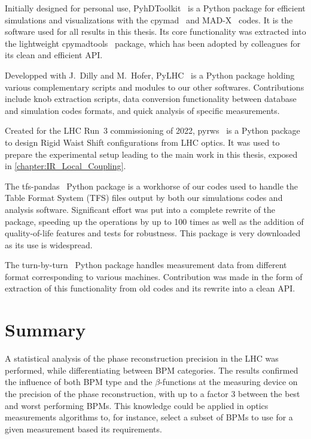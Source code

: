 Initially designed for personal use, PyhDToolkit~\cite{CODE:Soubelet:pyhdtoolkit} is a Python package for efficient simulations and visualizations with the cpymad~\cite{CODE:HIBTC:cpymad} and MAD-X~\cite{CODE:MADX_guide} codes.
It is the software used for all results in this thesis.
Its core functionality was extracted into the lightweight cpymadtools~\cite{CODE:Soubelet:cpymadtools} package, which has been adopted by colleagues for its clean and efficient API.

Developped with J.~Dilly and M.~Hofer, PyLHC~\cite{CODE:OMC:pylhc} is a Python package holding various complementary scripts and modules to our other softwares.
Contributions include knob extraction scripts, data conversion functionality between database and simulation codes formats, and quick analysis of specific measurements.

Created for the LHC Run~\num{3} commissioning of \num{2022}, pyrws~\cite{CODE:Soubelet:pyrws} is a Python package to design Rigid Waist Shift configurations from LHC optics.
It was used to prepare the experimental setup leading to the main work in this thesis, exposed in \cref{chapter:IR_Local_Coupling}.

The tfs-pandas~\cite{CODE:OMC:tfs_pandas} Python package is a workhorse of our codes used to handle the Table Format System (TFS) files output by both our simulations codes and analysis software.
Significant effort was put into a complete rewrite of the package, speeding up the operations by up to \num{100} times as well as the addition of quality-of-life features and tests for robustness.
This package is very downloaded as its use is widespread.

The turn-by-turn~\cite{CODE:OMC:turn_by_turn} Python package handles measurement data from different format corresponding to various machines.
Contribution was made in the form of extraction of this functionality from old codes and its rewrite into a clean API.

\section{Summary}

A statistical analysis of the phase reconstruction precision in the LHC was performed, while differentiating between BPM categories.
The results confirmed the influence of both BPM type and the \(\beta\)-functions at the measuring device on the precision of the phase reconstruction, with up to a factor \num{3} between the best and worst performing BPMs.
This knowledge could be applied in optics measurements algorithms to, for instance, select a subset of BPMs to use for a given measurement based its requirements.

